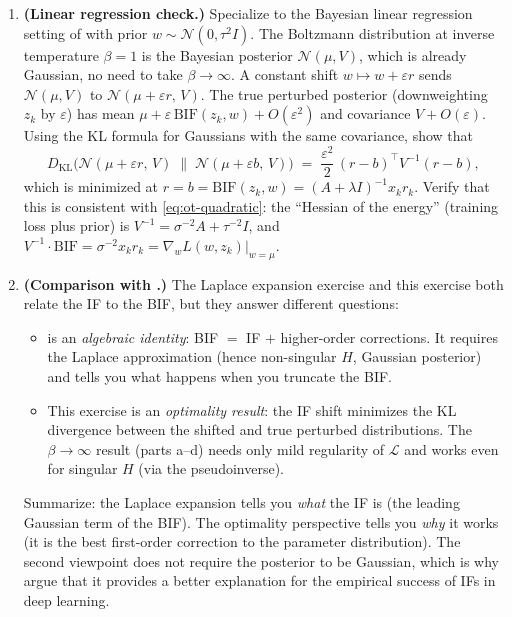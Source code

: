 \documentclass[11pt]{article}
\begin{document}
\begin{exercise}
\begin{enumerate}
  \item[(e)] \textbf{(Linear regression check.)} Specialize to the Bayesian linear regression setting of  with prior $w\sim\mathcal{N}(0,\tau^2I)$. The Boltzmann distribution at inverse temperature $\beta = 1$ is the Bayesian posterior $\mathcal{N}(\mu,V)$, which is already Gaussian, no need to take $\beta\to\infty$. A constant shift $w\mapsto w + \varepsilon r$ sends $\mathcal{N}(\mu,V)$ to $\mathcal{N}(\mu + \varepsilon r,\,V)$. The true perturbed posterior (downweighting $z_k$ by $\varepsilon$) has mean $\mu + \varepsilon\,\mathrm{BIF}(z_k,w) + O(\varepsilon^2)$ and covariance $V + O(\varepsilon)$. Using the KL formula for Gaussians with the same covariance, show that
  \[
    D_{\mathrm{KL}}\bigl(\mathcal{N}(\mu + \varepsilon r,\,V)\;\big\|\;\mathcal{N}(\mu + \varepsilon b,\,V)\bigr) \;=\; \frac{\varepsilon^2}{2}\,(r-b)^\top V^{-1}(r-b),
  \]
  which is minimized at $r = b = \mathrm{BIF}(z_k,w) = (A + \lambda I)^{-1}x_k r_k$. Verify that this is consistent with \eqref{eq:ot-quadratic}: the ``Hessian of the energy'' (training loss plus prior) is $V^{-1} = \sigma^{-2}A + \tau^{-2}I$, and $V^{-1}\cdot\mathrm{BIF} = \sigma^{-2}x_k r_k = \nabla_w L(w,z_k)\big|_{w=\mu}$.

  \item[(f)] \textbf{(Comparison with .)} The Laplace expansion exercise and this exercise both relate the IF to the BIF, but they answer different questions:
  \begin{itemize}
    \item {} is an \emph{algebraic identity}: BIF $=$ IF $+$ higher-order corrections. It requires the Laplace approximation (hence non-singular $H$, Gaussian posterior) and tells you what happens when you truncate the BIF.
    \item This exercise is an \emph{optimality result}: the IF shift minimizes the KL divergence between the shifted and true perturbed distributions. The $\beta\to\infty$ result (parts a--d) needs only mild regularity of $\mathcal{L}$ and works even for singular $H$ (via the pseudoinverse).
  \end{itemize}
  Summarize: the Laplace expansion tells you \emph{what} the IF is (the leading Gaussian term of the BIF). The optimality perspective tells you \emph{why} it works (it is the best first-order correction to the parameter distribution). The second viewpoint does not require the posterior to be Gaussian, which is why \citet{mlodozeniec2025distributional} argue that it provides a better explanation for the empirical success of IFs in deep learning.
\end{enumerate}
\end{exercise}
\end{document}
